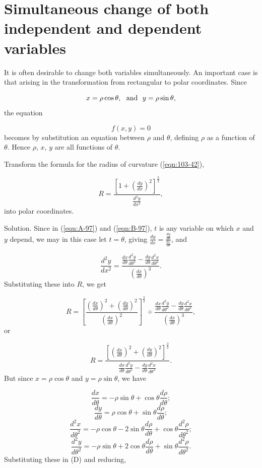 \section{Simultaneous change of both independent and dependent variables}
\label{sec:98}

It is often desirable to change both variables simultaneously. 
An important case is that arising in the transformation from 
rectangular to polar coordinates. Since

\[
 x = \rho \cos\theta, \ \ {\rm and}\ \  y = \rho \sin\theta,
\]
the equation

\[
    f(x,y) = 0
\]
becomes by substitution an equation between 
$\rho$ and $\theta$, defining $\rho$ as a function of $\theta$. 
Hence $\rho$, $x$, $y$ are all functions of $\theta$.

\begin{example}
{\rm
Transform the formula for the radius of curvature (\ref{eqn:103-42}), %

\[
R 	
= \frac{ \left[ 1 + \left( \frac{dy}{dx} \right)^2 
\right]^{\frac{3}{2}} }{ \frac{d^2 y}{dx^2} },
\]
into polar coordinates.

Solution. 
Since in (\ref{eqn:A-97}) and (\ref{eqn:B-97}), %
$t$ is any variable on which $x$ and $y$ depend, we 
may in this case let $t = \theta$, giving
$\frac{dy}{dx} 	= \frac{ \frac{dy}{d\theta} }{ \frac{dx}{d\theta} }$, and

\[
\frac{d^2 y}{dx^2} 	
= \frac{ \frac{dx}{d\theta} \frac{d^2 y}{d\theta^2} 
- \frac{dy}{d\theta} \frac{d^2 x}{d\theta^2} }{ \left( \frac{dx}{d\theta} \right)^3 }.
\]
Substituting these into $R$, %
we get

\[
 R = 	
\left[ \frac{ \left( \frac{dx}{d\theta} \right)^2 
+ \left( \frac{dy}{d\theta} \right)^2 }{ 
\left( \frac{dx}{d\theta} \right)^2 } \right]^{\frac{3}{2}} 
\div \frac{ \frac{dx}{d\theta} \frac{d^2 y}{d\theta^2} 
- \frac{dy}{d\theta} \frac{d^2 x}{d\theta^2} }{ 
\left( \frac{dx}{d\theta} \right)^3 }, 
\]
or

\begin{equation}
R = 	\frac{ \left[ \left( \frac{dx}{d\theta} \right)^2 
+ \left( \frac{dy}{d\theta} \right)^2 \right]^{\frac{3}{2}} }{ 
\frac{dx}{d\theta} \frac{d^2 y}{d\theta^2} 
- \frac{dy}{d\theta} \frac{d^2 x}{d\theta^2} }.
\label{eqn:D-98}
\end{equation}
But since $x = \rho \cos\theta$  and $y = \rho \sin\theta$, we have

\[
 \frac{dx}{d\theta} 
= - \rho \sin \theta + \cos \theta \frac{d\rho}{d\theta}; 
\]
\[
\frac{dy}{d\theta} = \rho \cos \theta + \sin \theta \frac{d\rho}{d\theta};
\]
\[
\frac{d^2 x}{d\theta^2} 
= -\rho \cos \theta - 2 \sin \theta \frac{d\rho}{d\theta} 
+ \cos \theta \frac{d^2 \rho}{d\theta^2}; 
\]
\[
\frac{d^2 y}{d\theta^2} = -\rho \sin \theta 
+ 2 \cos \theta \frac{d\rho}{d\theta} + \sin \theta \frac{d^2 \rho}{d\theta^2}.
\]
Substituting these in (D) and reducing,

}
\end{example}
